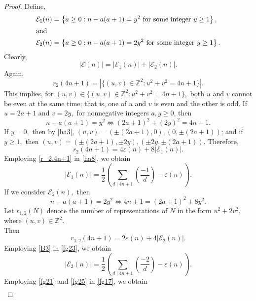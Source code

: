 \documentclass[10pt,a4paper]{amsart}
\begin{document}
\begin{proof}
Define, 
\begin{align}
\label{fg15}\mathcal{E}_1(n)
&=
\left\{
a\geq0:
n-a(a+1)=y^2
\text{ for some integer } y\geq1
\right\},\\
\intertext{and}
\label{fg16}\mathcal{E}_2(n)
&=
\left\{
a\geq0:
n-a(a+1)=2y^2
\text{ for some integer } y\geq1
\right\}.
\end{align}
Clearly, 
\begin{equation}\label{fg17}
|\mathcal{E}(n)|=|\mathcal{E}_1(n)|+|\mathcal{E}_2(n)|.
\end{equation}
Again,
$$r_2(4n+1)
=|\{(u,v)\in\mathbb Z^2:u^2+v^2=4n+1\}|.$$
This implies, for $(u,v)\in \{(u,v)\in\mathbb Z^2:u^2+v^2=4n+1\},$ 
both $u$ and $v$ cannot be even at the same time; that is, one of   $u$ and $v$ is even and the other is  odd. If $u=2a+1$ and $v=2y,$ for nonnegative integers $a,y\geq0$,  then 
\begin{equation}\label{ha3}
n-a(a+1)=y^2\iff
(2a+1)^2+(2y)^2=4n+1 .
\end{equation}
If $y=0,$ then by  \eqref{ha3},  $(u,v)=(\pm(2a+1),0),(0,\pm(2a+1))$; and if  $y\geq1,$ then  $(u,v)=(\pm(2a+1),\pm 2y),(\pm 2y,\pm(2a+1)).$
Therefore,
\begin{equation}\label{ha8}
r_2(4n+1)
=
4\varepsilon(n)+8|\mathcal E_1(n)|.
\end{equation}
Employing \eqref{r_2.4n+1} in \eqref{ha8}, we obtain
\begin{equation}
    |\mathcal E_1(n)|
=
\dfrac{1}{2}
\left(
\sum_{d\mid 4n+1}\left(\dfrac{-1}{d}\right)
-
\varepsilon(n)
\right).
\label{fg21}
\end{equation}
If we consider  $\mathcal{E}_2(n),$ then 
\begin{equation}\label{fg22}
n-a(a+1)=2y^2
\Longleftrightarrow
4n+1=(2a+1)^2+8y^2.
\end{equation}
Let $r_{1,2}(N)$ denote the number of representations of $N$ in the form $u^2+2v^2,$ where $(u,v)\in\mathbb{Z}^2.$\\ Then
\begin{equation}\label{fg23}
r_{1,2}(4n+1)=2\varepsilon(n)+4|\mathcal{E}_2(n)|.
\end{equation}
Employing \eqref{B3} in \eqref{fg23}, we obtain
\begin{equation}\label{fg25}
|\mathcal{E}_2(n)|
=
\dfrac{1}{2}
\left(
\sum_{d\mid 4n+1}\left(\dfrac{-2}{d}\right)
-
\varepsilon(n)
\right).
\end{equation}
Employing \eqref{fg21} and \eqref{fg25} in  \eqref{fg17},  we obtain
\begin{align}

\end{align}
\end{proof}
\end{document}
